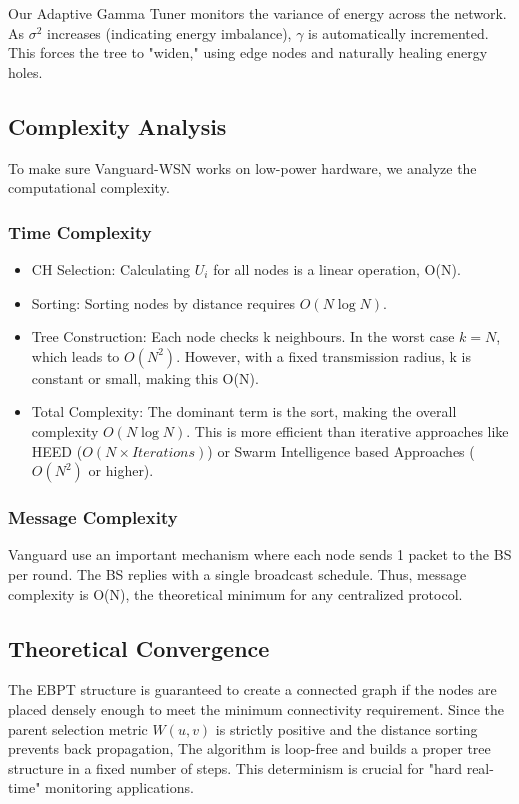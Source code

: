 \documentclass[conference]{IEEEtran}
\begin{document}
Our Adaptive Gamma Tuner monitors the variance of energy across the network. As $\sigma^2$ increases (indicating energy imbalance), $\gamma$ is automatically incremented. This forces the tree to "widen," using edge nodes and naturally healing energy holes.

\subsection{Complexity Analysis}
To make sure Vanguard-WSN works on low-power hardware, we analyze the computational complexity.

\subsubsection{Time Complexity}
\begin{itemize}
    \item CH Selection: Calculating $U_i$ for all nodes is a linear operation, O(N).
    \item Sorting: Sorting nodes by distance requires $O(N \log N)$.
    \item Tree Construction: Each node checks k neighbours. In the worst case $k=N$, which leads to $O(N^2)$. However, with a fixed transmission radius, k is constant or small, making this O(N).
    \item Total Complexity: The dominant term is the sort, making the overall complexity $O(N \log N)$. This is more efficient than iterative approaches like HEED ($O(N \times Iterations)$) or Swarm Intelligence based Approaches ($O(N^2)$ or higher).
\end{itemize}

\subsubsection{Message Complexity}
Vanguard use an important mechanism where each node sends 1 packet to the BS per round. The BS replies with a single broadcast schedule. Thus, message complexity is O(N), the theoretical minimum for any centralized protocol.

\subsection{Theoretical Convergence}
The EBPT structure is guaranteed to create a connected graph if the nodes are placed densely enough to meet the minimum connectivity requirement. Since the parent selection metric $W(u, v)$ is strictly positive and the distance sorting prevents back propagation, The algorithm is loop-free and builds a proper tree structure in a fixed number of steps. This determinism is crucial for "hard real-time" monitoring applications.
\end{document}
